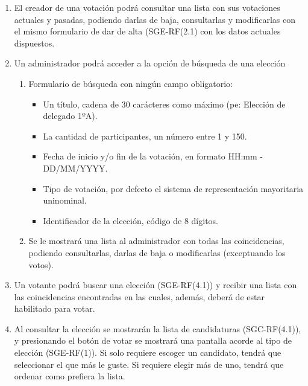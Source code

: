 \documentclass{article}
\begin{document}
\begin{enumerate}[label=\textbf{SGE-RF(\arabic*)}, labelwidth=25mm, labelsep=2mm, itemindent=0mm, leftmargin=*, align=parleft]
            \item El creador de una votación podrá consultar una lista con sus votaciones actuales y pasadas, podiendo darlas de baja, consultarlas y modificarlas con el mismo formulario de dar de alta (SGE-RF(2.1) con los datos actuales dispuestos.

            \item Un administrador podrá acceder a la opción de búsqueda de una elección
            \begin{adjustwidth}{15mm}{0mm}
                \begin{enumerate}[label=\textbf{SGU-RF(4.\arabic*)}]
                    \item Formulario de búsqueda con ningún campo obligatorio:
                        \begin{itemize}
                            \item Un título, cadena de 30 carácteres como máximo (pe: Elección de delegado 1ºA).
                            \item La cantidad de participantes, un número entre 1 y 150.
                            \item Fecha de inicio y/o fin de la votación, en formato HH:mm - DD/MM/YYYY.
                            \item Tipo de votación, por defecto el sistema de representación mayoritaria uninominal.
                            \item Identificador de la elección, código de 8 dígitos.
                        \end{itemize}
                    \item Se le mostrará una lista al administrador con todas las coincidencias, podiendo consultarlas, darlas de baja o modificarlas (exceptuando los votos).
                \end{enumerate}
            \end{adjustwidth}

            \item Un votante podrá buscar una elección (SGE-RF(4.1)) y recibir una lista con las coincidencias encontradas en las cuales, además, deberá de estar habilitado para votar.

            \item Al consultar la elección se mostrarán la lista de candidaturas (SGC-RF(4.1)), y presionando el botón de votar se mostrará una pantalla acorde al tipo de elección (SGE-RF(1)). Si solo requiere escoger un candidato, tendrá que seleccionar el que más le guste. Si requiere elegir más de uno, tendrá que ordenar como prefiera la lista. 


\end{enumerate}
\end{document}

